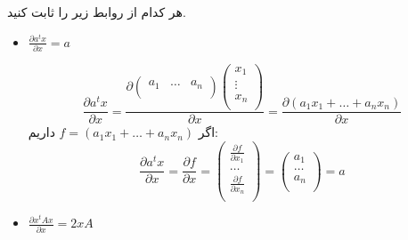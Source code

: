 
هر کدام از روابط زیر را ثابت کنید.
\begin{itemize}
	\item 
	$\frac{\partial a^tx}{\partial x} = a$
	
	$$
	\frac{\partial a^tx}{\partial x} = 
	\frac{\partial \begin{pmatrix}
		a_1 & \dots & a_n \\
		\end{pmatrix}
		\begin{pmatrix}
		x_1 \\
		\vdots \\
		x_n \\
		\end{pmatrix}}{\partial x}
	= \frac{\partial (a_1x_1 + \dots + a_nx_n)}{\partial x}
	$$
	اگر $f = (a_1x_1 + \dots + a_nx_n)$ داریم:
	$$
	\frac{\partial a^tx}{\partial x} = 	\frac{\partial f}{\partial x} = 
	\begin{pmatrix}
		\frac{\partial f}{\partial x_1} \\
		 \dots \\ \frac{\partial f}{\partial x_n}\\
	\end{pmatrix} =
	\begin{pmatrix}
	a_1 \\
	\dots \\
	 a_n \\
	\end{pmatrix}
	= a
	$$
	\item 
	$\frac{\partial x^tAx}{\partial x} = 2xA$
\end{itemize}
